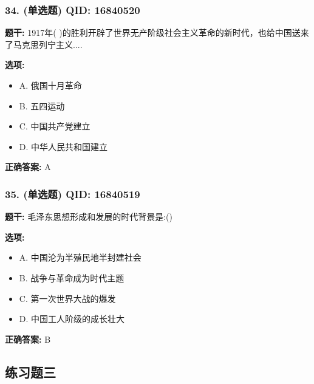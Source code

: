 \documentclass[12pt,UTF8]{ctexart}
\begin{document}
\subsubsection*{34. (单选题) \small QID: 16840520}

\textbf{题干:}
1917年( )的胜利开辟了世界无产阶级社会主义革命的新时代，也给中国送来了马克思列宁主义....

\textbf{选项:}
\begin{itemize}[leftmargin=*]

  \item A. 俄国十月革命

  \item B. 五四运动

  \item C. 中国共产党建立

  \item D. 中华人民共和国建立

\end{itemize}

\textbf{正确答案:}
A

\vspace{0.3em}\hrulefill\vspace{0.7em}

\subsubsection*{35. (单选题) \small QID: 16840519}

\textbf{题干:}
毛泽东思想形成和发展的时代背景是:()

\textbf{选项:}
\begin{itemize}[leftmargin=*]

  \item A. 中国沦为半殖民地半封建社会

  \item B. 战争与革命成为时代主题

  \item C. 第一次世界大战的爆发

  \item D. 中国工人阶级的成长壮大

\end{itemize}

\textbf{正确答案:}
B

\vspace{0.3em}\hrulefill\vspace{0.7em}

\subsection*{练习题三}
\end{document}

